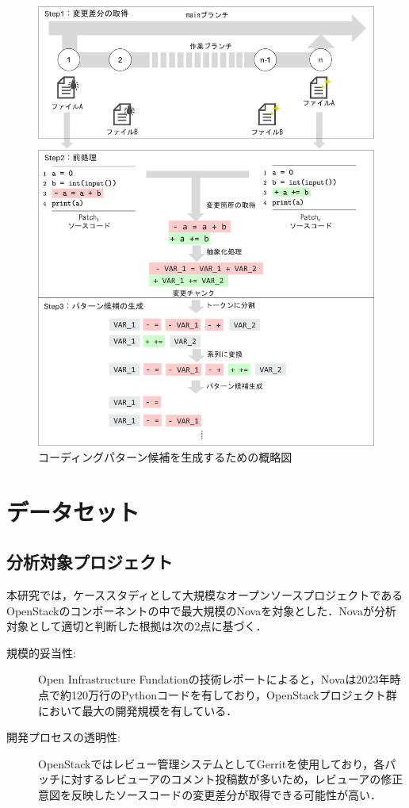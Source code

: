 \documentclass[11pt]{jreport}
\begin{document}
\begin{figure}[h]
    \centering
        \includegraphics[width=1.0\linewidth]{@BSthesis2024_Noguchi/Noguchi_fig/create_pattern.pdf}
        \caption{コーディングパターン候補を生成するための概略図}
        \label{fig:pattern}
\end{figure}

\chapter{データセット}\label{sec:dataset}
\section{分析対象プロジェクト}
本研究では，ケーススタディとして大規模なオープンソースプロジェクトであるOpenStackのコンポーネントの中で最大規模のNovaを対象とした．Novaが分析対象として適切と判断した根拠は次の2点に基づく．
\begin{description}
    \item[規模的妥当性:]Open Infrastructure Fundationの技術レポート\cite{openstack}によると，Novaは2023年時点で約120万行のPythonコードを有しており，OpenStackプロジェクト群において最大の開発規模を有している．
    \item[開発プロセスの透明性:]OpenStackではレビュー管理システムとしてGerritを使用しており，各パッチに対するレビューアのコメント投稿数が多いため，レビューアの修正意図を反映したソースコードの変更差分が取得できる可能性が高い．
\end{description}
\end{document}
